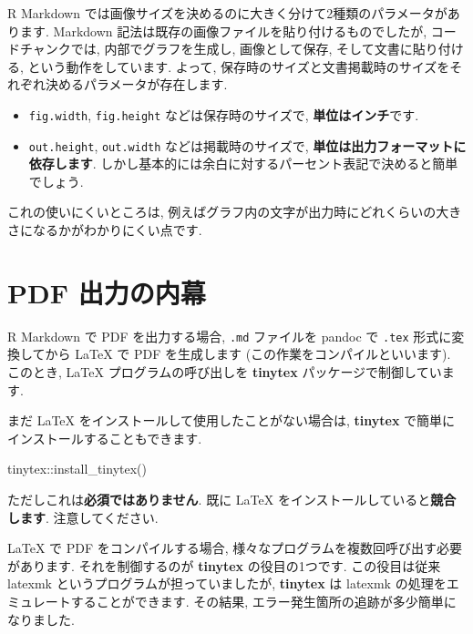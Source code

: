\documentclass[
]{bxjsarticle}
\newenvironment{Shaded}{\begin{snugshade}}{\end{snugshade}}
\newcommand{\FunctionTok}[1]{\textcolor[rgb]{0.00,0.00,0.00}{#1}}
\newcommand{\NormalTok}[1]{#1}
\newcommand{\SpecialCharTok}[1]{\textcolor[rgb]{0.00,0.00,0.00}{#1}}
\begin{document}
R Markdown では画像サイズを決めるのに大きく分けて2種類のパラメータがあります. Markdown 記法は既存の画像ファイルを貼り付けるものでしたが, コードチャンクでは, 内部でグラフを生成し, 画像として保存, そして文書に貼り付ける, という動作をしています. よって, 保存時のサイズと文書掲載時のサイズをそれぞれ決めるパラメータが存在します.

\begin{itemize}
\item
  \texttt{fig.width}, \texttt{fig.height} などは保存時のサイズで, \textbf{単位はインチ}です.
\item
  \texttt{out.height}, \texttt{out.width} などは掲載時のサイズで, \textbf{単位は出力フォーマットに依存します}. しかし基本的には余白に対するパーセント表記で決めると簡単でしょう.
\end{itemize}

これの使いにくいところは, 例えばグラフ内の文字が出力時にどれくらいの大きさになるかがわかりにくい点です.

\hypertarget{pdf-ux51faux529bux306eux5185ux5e55}{%
\section{PDF 出力の内幕}\label{pdf-ux51faux529bux306eux5185ux5e55}}

R Markdown で PDF を出力する場合, \texttt{.md} ファイルを pandoc で \texttt{.tex} 形式に変換してから LaTeX で PDF を生成します (この作業をコンパイルといいます). このとき, LaTeX プログラムの呼び出しを \textbf{tinytex} パッケージで制御しています.

まだ LaTeX をインストールして使用したことがない場合は, \textbf{tinytex} で簡単にインストールすることもできます.

\begin{Shaded}
\begin{Highlighting}[numbers=left,,]
\NormalTok{tinytex}\SpecialCharTok{::}\FunctionTok{install\_tinytex}\NormalTok{()}
\end{Highlighting}
\end{Shaded}

ただしこれは\textbf{必須ではありません}. 既に LaTeX をインストールしていると\textbf{競合します}. 注意してください.

LaTeX で PDF をコンパイルする場合, 様々なプログラムを複数回呼び出す必要があります. それを制御するのが \textbf{tinytex} の役目の1つです. この役目は従来 latexmk というプログラムが担っていましたが, \textbf{tinytex} は latexmk の処理をエミュレートすることができます. その結果, エラー発生箇所の追跡が多少簡単になりました.
\end{document}
